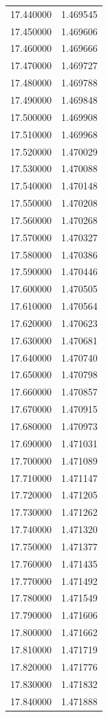 \begin{tabular}{rr}
17.440000 & 1.469545 \\
17.450000 & 1.469606 \\
17.460000 & 1.469666 \\
17.470000 & 1.469727 \\
17.480000 & 1.469788 \\
17.490000 & 1.469848 \\
17.500000 & 1.469908 \\
17.510000 & 1.469968 \\
17.520000 & 1.470029 \\
17.530000 & 1.470088 \\
17.540000 & 1.470148 \\
17.550000 & 1.470208 \\
17.560000 & 1.470268 \\
17.570000 & 1.470327 \\
17.580000 & 1.470386 \\
17.590000 & 1.470446 \\
17.600000 & 1.470505 \\
17.610000 & 1.470564 \\
17.620000 & 1.470623 \\
17.630000 & 1.470681 \\
17.640000 & 1.470740 \\
17.650000 & 1.470798 \\
17.660000 & 1.470857 \\
17.670000 & 1.470915 \\
17.680000 & 1.470973 \\
17.690000 & 1.471031 \\
17.700000 & 1.471089 \\
17.710000 & 1.471147 \\
17.720000 & 1.471205 \\
17.730000 & 1.471262 \\
17.740000 & 1.471320 \\
17.750000 & 1.471377 \\
17.760000 & 1.471435 \\
17.770000 & 1.471492 \\
17.780000 & 1.471549 \\
17.790000 & 1.471606 \\
17.800000 & 1.471662 \\
17.810000 & 1.471719 \\
17.820000 & 1.471776 \\
17.830000 & 1.471832 \\
17.840000 & 1.471888 \\

\end{tabular}
